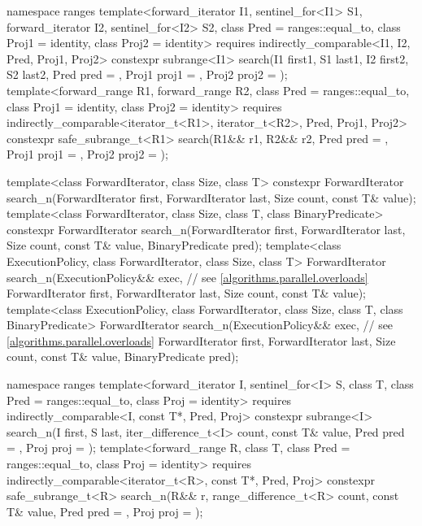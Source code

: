 \begin{codeblock}
{  namespace ranges {
    template<forward_iterator I1, sentinel_for<I1> S1, forward_iterator I2,
             sentinel_for<I2> S2, class Pred = ranges::equal_to,
             class Proj1 = identity, class Proj2 = identity>
      requires indirectly_comparable<I1, I2, Pred, Proj1, Proj2>
      constexpr subrange<I1>
        search(I1 first1, S1 last1, I2 first2, S2 last2, Pred pred = {},
               Proj1 proj1 = {}, Proj2 proj2 = {});
    template<forward_range R1, forward_range R2, class Pred = ranges::equal_to,
             class Proj1 = identity, class Proj2 = identity>
      requires indirectly_comparable<iterator_t<R1>, iterator_t<R2>, Pred, Proj1, Proj2>
      constexpr safe_subrange_t<R1>
        search(R1&& r1, R2&& r2, Pred pred = {},
               Proj1 proj1 = {}, Proj2 proj2 = {});
  }

  template<class ForwardIterator, class Size, class T>
    constexpr ForwardIterator
      search_n(ForwardIterator first, ForwardIterator last,
               Size count, const T& value);
  template<class ForwardIterator, class Size, class T, class BinaryPredicate>
    constexpr ForwardIterator
      search_n(ForwardIterator first, ForwardIterator last,
               Size count, const T& value,
               BinaryPredicate pred);
  template<class ExecutionPolicy, class ForwardIterator, class Size, class T>
    ForwardIterator
      search_n(ExecutionPolicy&& exec,                          // see \ref{algorithms.parallel.overloads}
               ForwardIterator first, ForwardIterator last,
               Size count, const T& value);
  template<class ExecutionPolicy, class ForwardIterator, class Size, class T,
           class BinaryPredicate>
    ForwardIterator
      search_n(ExecutionPolicy&& exec,                          // see \ref{algorithms.parallel.overloads}
               ForwardIterator first, ForwardIterator last,
               Size count, const T& value,
               BinaryPredicate pred);

  namespace ranges {
    template<forward_iterator I, sentinel_for<I> S, class T,
             class Pred = ranges::equal_to, class Proj = identity>
      requires indirectly_comparable<I, const T*, Pred, Proj>
      constexpr subrange<I>
        search_n(I first, S last, iter_difference_t<I> count,
                 const T& value, Pred pred = {}, Proj proj = {});
    template<forward_range R, class T, class Pred = ranges::equal_to,
             class Proj = identity>
      requires indirectly_comparable<iterator_t<R>, const T*, Pred, Proj>
      constexpr safe_subrange_t<R>
        search_n(R&& r, range_difference_t<R> count,
                 const T& value, Pred pred = {}, Proj proj = {});
  }

}
\end{codeblock}
